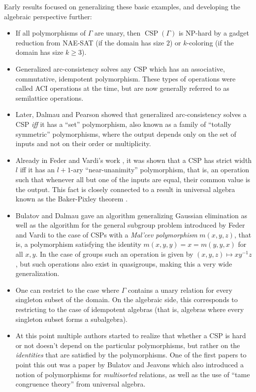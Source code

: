 \documentclass[letterpaper,11pt]{article}
\DeclareMathOperator{\CSP}{CSP}
\begin{document}
Early results focused on generalizing these basic examples, and developing the algebraic perspective further:
\begin{itemize}
\item If all polymorphisms of $\Gamma$ are unary, then $\CSP(\Gamma)$ is NP-hard by a gadget reduction from NAE-SAT (if the domain has size $2$) or $k$-coloring (if the domain has size $k \ge 3$).

\item Generalized arc-consistency solves any CSP which has an associative, commutative, idempotent polymorphism. These types of operations were called ACI operations at the time, but are now generally referred to as semilattice operations.

\item Later, Dalmau and Pearson \cite{dalmau-width-1} showed that generalized arc-consistency solves a CSP \emph{iff} it has a ``set'' polymorphism, also known as a family of ``totally symmetric'' polymorphisms, where the output depends only on the set of inputs and not on their order or multiplicity.

\item Already in Feder and Vardi's work \cite{feder-vardi}, it was shown that a CSP has strict width $l$ iff it has an $l+1$-ary ``near-unanimity'' polymorphism, that is, an operation such that whenever all but one of the inputs are equal, their common value is the output. This fact is closely connected to a result in universal algebra known as the Baker-Pixley theorem \cite{baker-pixley}.

\item Bulatov and Dalmau \cite{bulatov-dalmau-malcev} gave an algorithm generalizing Gaussian elimination as well as the algorithm for the general subgroup problem introduced by Feder and Vardi to the case of CSPs with a \emph{Mal'cev polymorphism} $m(x,y,z)$, that is, a polymorphism satisfying the identity $m(x,y,y) = x = m(y,y,x)$ for all $x,y$. In the case of groups such an operation is given by $(x,y,z) \mapsto xy^{-1}z$, but such operations also exist in quasigroups, making this a very wide generalization.

\item One can restrict to the case where $\Gamma$ contains a unary relation for every singleton subset of the domain. On the algebraic side, this corresponds to restricting to the case of idempotent algebras (that is, algebras where every singleton subset forms a subalgebra).

\item At this point multiple authors started to realize that whether a CSP is hard or not doesn't depend on the particular polymorphisms, but rather on the \emph{identities} that are satisfied by the polymorphisms. One of the first papers to point this out was a paper by Bulatov and Jeavons \cite{bulatov-jeavons-varieties} which also introduced a notion of polymorphisms for \emph{multisorted} relations, as well as the use of ``tame congruence theory'' from universal algebra.


\end{itemize}
\end{document}
